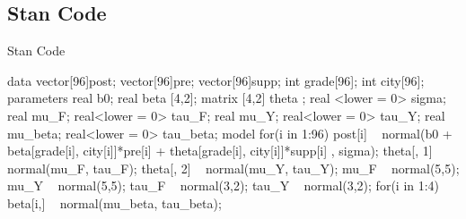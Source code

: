 \documentclass{article}
\begin{document}
\subsection{Stan Code}
\begin{sexylisting}{Stan Code}

data{
  vector[96]post;
  vector[96]pre;
  vector[96]supp;
  int grade[96];
  int city[96];
}
parameters{
  real b0;
  real beta [4,2];
  matrix [4,2] theta ;
  real <lower = 0> sigma;
  real mu_F;
  real<lower = 0> tau_F;
  real mu_Y;
  real<lower = 0> tau_Y;
  real mu_beta;
  real<lower = 0> tau_beta;
}
model{
  for(i in 1:96){
    post[i] ~ normal(b0 + beta[grade[i], city[i]]*pre[i] + 
                          theta[grade[i], city[i]]*supp[i] ,
                          sigma);
  }
  theta[, 1] ~ normal(mu_F, tau_F);
  theta[, 2] ~ normal(mu_Y, tau_Y);
  mu_F ~ normal(5,5);
  mu_Y ~ normal(5,5);
  tau_F ~ normal(3,2);
  tau_Y ~ normal(3,2);
  for(i in 1:4){
    beta[i,] ~ normal(mu_beta, tau_beta);
  }
}









\end{sexylisting}
\end{document}
